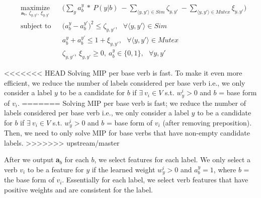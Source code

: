 \scriptsize
\begin{equation}
\begin{aligned}
& \operatorname*{maximize}_{\textbf{a}_b,\ \zeta_{y, y'},\ \xi_{y, y'}}
& & \bigg( \sum_{y} a_{b}^{y}\ *\ P(y | b)\ - \sum_{\langle y, y'\rangle \in Sim} \zeta_{y, y'}\ - \sum_{\langle y, y'\rangle \in Mutex} \xi_{y, y'}\bigg) \\ 
& \text{subject to} & & \big(a_{b}^{y} - a_{b}^{y'}\big)^2 \leq \zeta_{y, y'},\ \ \ \forall \langle y, y'\rangle \in Sim \\
& & & a_{b}^{y} + a_{b}^{y'} \leq 1 + \xi_{y, y'},\ \ \ \forall \langle y, y'\rangle \in Mutex \\
& & & \zeta_{y, y'},\ \xi_{y, y'} \geq 0,\ a_{b}^{y} \in \{0, 1\},\ \ \ \forall y, y'
\label{eqn:mip}
\end{aligned}
\end{equation}
\normalsize

<<<<<<< HEAD
Solving MIP per base verb is fast. To make it even more efficient, we reduce the number of labels considered per base verb i.e., we only consider a label $y$ to be a candidate for $b$ if $\exists\ v_i \in V$ s.t. $w_y^i > 0$ and $b$ = base form of $v_i$. %
=======
Solving MIP per base verb is fast; we reduce the number of labels considered per base verb i.e., we only consider a label $y$ to be a candidate for $b$ if $\exists\ v_i \in V$ s.t. $w_y^i > 0$ and $b$ = base form of $v_i$ (after removing preposition). Then, we need to only solve MIP for base verbs that have non-empty candidate labels. 
>>>>>>> upstream/master

After we output \textbf{a}$_b$ for each $b$, we select features for each label. We only select a verb $v_i$ to be a feature for $y$ if the learned weight $w_y^i > 0$ and $a_b^{y} = 1$, where $b$ = the base form of $v_i$. Essentially for each label, we select verb features that have positive weights and are consistent for the label.